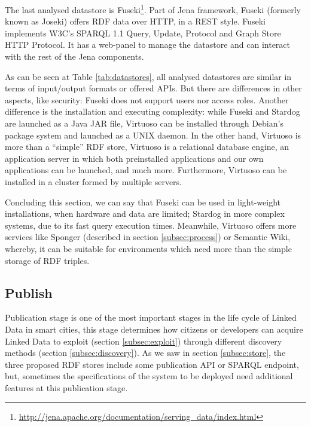 The last analysed datastore is Fuseki\footnote{\url{http://jena.apache.org/documentation/serving_data/index.html}}. Part of Jena framework, Fuseki (formerly known as Joseki) offers RDF data over HTTP, in a REST style. Fuseki implements W3C's SPARQL 1.1 Query, Update, Protocol and Graph Store HTTP Protocol. It has a web-panel to manage the datastore and can interact with the rest of the Jena components.

As can be seen at Table \ref{tab:datastores}, all analysed datastores are similar in terms of input/output formats or offered APIs. But there are differences in other aspects, like security: Fuseki does not support users nor access roles. Another difference is the installation and executing complexity: while Fuseki and Stardog are launched as a Java JAR file, Virtuoso can be installed through Debian's package system and launched as a UNIX daemon. In the other hand, Virtuoso is more than a ``simple'' RDF store, Virtuoso is a relational database engine, an application server in which both preinstalled applications and our own applications can be launched, and much more. Furthermore, Virtuoso can be installed in a cluster formed by multiple servers.

Concluding this section, we can say that Fuseki can be used in light-weight installations, when hardware and data are limited; Stardog in more complex systems, due to its fast query execution times. Meanwhile, Virtuoso offers more services like Sponger (described in section \ref{subsec:process}) or Semantic Wiki, whereby, it can be suitable for environments which need more than the simple storage of RDF triples.


\subsection{Publish}\label{subsec:publish}

Publication stage is one of the most important stages in the life cycle of Linked Data in smart cities, this stage determines how citizens or developers can acquire Linked Data to exploit (section \ref{subsec:exploit}) through different discovery methods (section \ref{subsec:discovery}). As we saw in section \ref{subsec:store}, the three proposed RDF stores include some publication API or SPARQL endpoint, but, sometimes the specifications of the system to be deployed need additional features at this publication stage.

